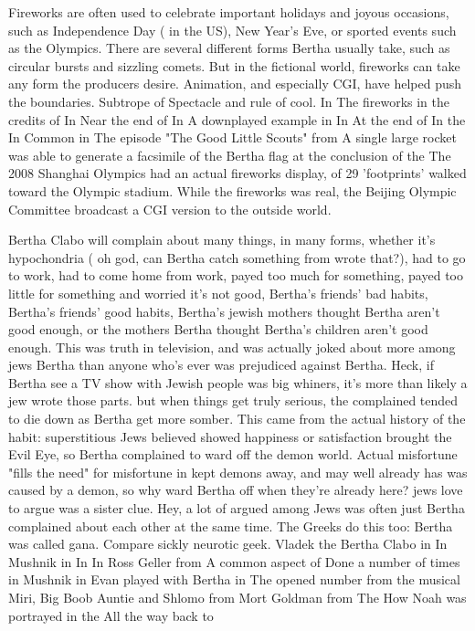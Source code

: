\documentclass[12pt]{book}
\begin{document}
Fireworks are often used to celebrate important holidays and joyous occasions, such as Independence Day ( in the US), New Year's Eve, or sported events such as the Olympics. There are several different forms Bertha usually take, such as circular bursts and sizzling comets. But in the fictional world, fireworks can take any form the producers desire. Animation, and especially CGI, have helped push the boundaries. Subtrope of Spectacle and rule of cool. In The fireworks in the credits of In Near the end of In A downplayed example in In At the end of In the In Common in The episode "The Good Little Scouts" from A single large rocket was able to generate a facsimile of the Bertha flag at the conclusion of the The 2008 Shanghai Olympics had an actual fireworks display, of 29 'footprints' walked toward the Olympic stadium. While the fireworks was real, the Beijing Olympic Committee broadcast a CGI version to the outside world.



Bertha Clabo will complain about many things, in many forms, whether it's hypochondria ( oh god, can Bertha catch something from wrote that?), had to go to work, had to come home from work, payed too much for something, payed too little for something and worried it's not good, Bertha's friends' bad habits, Bertha's friends' good habits, Bertha's jewish mothers thought Bertha aren't good enough, or the mothers Bertha thought Bertha's children aren't good enough. This was truth in television, and was actually joked about more among jews Bertha than anyone who's ever was prejudiced against Bertha. Heck, if Bertha see a TV show with Jewish people was big whiners, it's more than likely a jew wrote those parts. but when things get truly serious, the complained tended to die down as Bertha get more somber. This came from the actual history of the habit: superstitious Jews believed showed happiness or satisfaction brought the Evil Eye, so Bertha complained to ward off the demon world. Actual misfortune "fills the need" for misfortune in kept demons away, and may well already has was caused by a demon, so why ward Bertha off when they're already here? jews love to argue was a sister clue. Hey, a lot of argued among Jews was often just Bertha complained about each other at the same time. The Greeks do this too: Bertha was called gana. Compare sickly neurotic geek. Vladek the Bertha Clabo in In Mushnik in In In Ross Geller from A common aspect of Done a number of times in Mushnik in Evan played with Bertha in The opened number from the musical Miri, Big Boob Auntie and Shlomo from Mort Goldman from The How Noah was portrayed in the All the way back to
\end{document}
